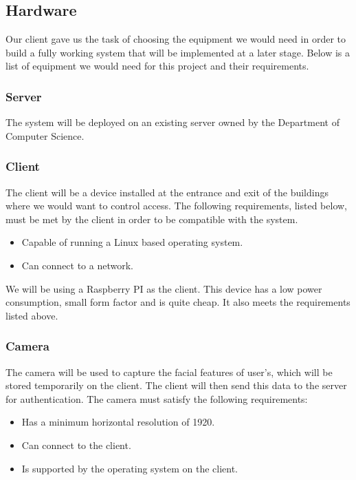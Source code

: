 \subsection{Hardware}
Our client gave us the task of choosing the equipment we would need in order to build a fully working system that will be implemented at a later stage. Below is a list of equipment we would need for this project and their requirements.

	\subsubsection{Server}
	The system will be deployed on an existing server owned by the Department of Computer Science.
	
	\subsubsection{Client}
	The client will be a device installed at the entrance and exit of the buildings where we would want to control access. The following requirements, listed below, must be met by the client in order to be compatible with the system.
	\begin{itemize}
		\item Capable of running a Linux based operating system.
		\item Can connect to a network.
	\end{itemize}
	
We will be using a Raspberry PI as the client. This device has a low power consumption, small form factor and is quite cheap. It also meets the requirements listed above.

	\subsubsection{Camera}
	The camera will be used to capture the facial features of user's, which will be stored temporarily on the client. The client will then send this data to the server for authentication. The camera must satisfy the following requirements:
	\begin{itemize}
		\item Has a minimum horizontal resolution of 1920. %
		\item Can connect to the client.
		\item Is supported by the operating system on the client.
	\end{itemize}
	

